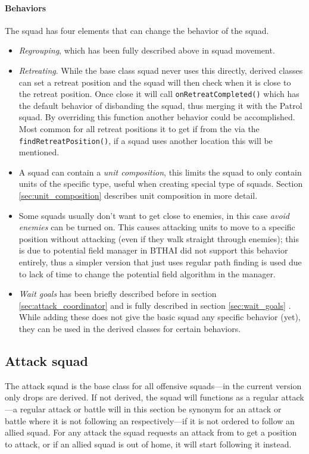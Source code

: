 \paragraph{Behaviors}
The squad has four elements that can change the behavior of the squad.
\begin{itemize}
	\item \emph{Regrouping}, which has been fully described above in squad movement.
	\item \emph{Retreating}. While the base class squad never uses this directly, derived classes can set a retreat position and the squad will then check when it is close to the retreat position. Once close it will call \texttt{onRetreatCompleted()} which has the default behavior of disbanding the squad, thus merging it with the Patrol squad. By overriding this function another behavior could be accomplished. Most common for all retreat positions it to get if from the  via the \texttt{findRetreatPosition()}, if a squad uses another location this will be mentioned.
	\item A squad can contain a \emph{unit composition}, this limits the squad to only contain units of the specific type, useful when creating special type of squads. Section \ref{sec:unit_composition} describes unit composition in more detail.
	\item Some squads usually don't want to get close to enemies, in this case \emph{avoid enemies} can be turned on. This causes attacking units to move to a specific position without attacking (even if they walk straight through enemies); this is due to potential field manager in BTHAI did not support this behavior entirely, thus a simpler version that just uses regular path finding is used due to lack of time to change the potential field algorithm in the manager.
	\item \emph{Wait goals} has been briefly described before in section \ref{sec:attack_coordinator}  and is fully described in section \ref{sec:wait_goals} . While adding these does not give the basic squad any specific behavior (yet), they can be used in the derived classes for certain behaviors.
\end{itemize}

\subsection{Attack squad}
\label{sec:attack_squad}
The attack squad is the base class for all offensive squads—in the current version only drops are derived. If not derived, the squad will functions as a regular attack—a regular attack or battle will in this section be synonym for an attack or battle where it is not following an  respectively—if it is not ordered to follow an allied squad. For any attack the squad requests an attack from  to get a position to attack, or if an allied squad is out of home, it will start following it instead.

